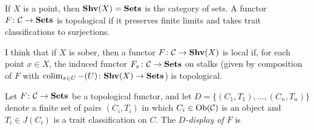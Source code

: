 \documentclass{amsart}
\def\Shv{{\bf Shv}}
\begin{document}
\begin{example}

If $X$ is a point, then $\Shv(X)=\Sets$ is the category of sets.  A functor $F\colon\mathcal{C}\rightarrow{\bf Sets}$ is topological if it preserves finite limits and takes trait classifications to surjections.

I think that if $X$ is sober, then a functor $F\taking\mcC\to\Shv(X)$ is local if, for each point $x\in X$, the induced functor $F_x\colon\mathcal{C}\rightarrow{\bf Sets}$ on stalks (given by composition of $F$ with $\colim_{x\in U}-(U)\taking\Shv(X)\to\Sets$) is topological.

\end{example}

\begin{definition}

Let $F\colon\mathcal{C}\rightarrow{\bf Sets}$ be a topological functor, and let $D=\{(C_1,T_1),\ldots,(C_n,T_n)\}$ denote a finite set of pairs $(C_i,T_i)$ in which $C_i\in\textnormal{Ob}(\mathcal{C})$ is an object and $T_i\in J(C_i)$ is a trait classification on $C$.  The {\em $D$-display of $F$} is 

\end{definition}
\end{document}
